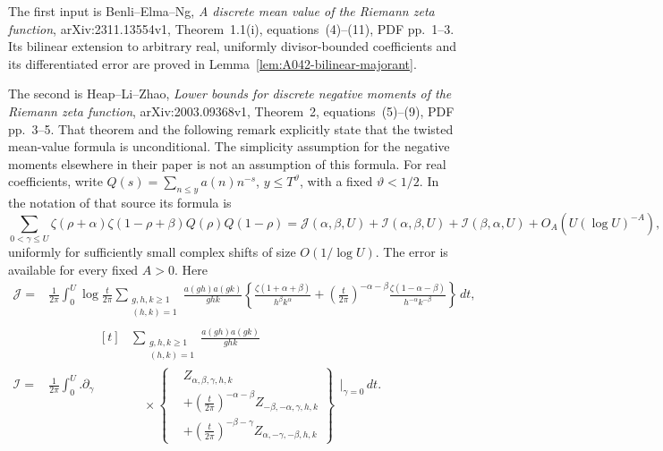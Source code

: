 The first input is Benli--Elma--Ng,
\emph{A discrete mean value of the Riemann zeta function},
arXiv:2311.13554v1, Theorem~1.1(i), equations~(4)--(11),
PDF pp.~1--3.  Its bilinear extension to arbitrary real,
uniformly divisor-bounded coefficients and its differentiated
error are proved in
Lemma~\ref{lem:A042-bilinear-majorant}.

The second is Heap--Li--Zhao,
\emph{Lower bounds for discrete negative moments of the Riemann
zeta function}, arXiv:2003.09368v1, Theorem~2, equations~(5)--(9),
PDF pp.~3--5.  That theorem and the following remark explicitly
state that the twisted mean-value formula is unconditional.
The simplicity assumption for the negative moments elsewhere
in their paper is not an assumption of this formula.
For real coefficients, write \(Q(s)=\sum_{n\le y}a(n)n^{-s}\),
\(y\le T^\vartheta\), with a fixed \(\vartheta<1/2\).  In the
notation of that source its formula is
\begin{equation}\label{eq:A047-HLZ}
 \sum_{0<\gamma\le U}\zeta(\rho+\alpha)
          \zeta(1-\rho+\beta)Q(\rho)Q(1-\rho)
 =\mathcal J(\alpha,\beta,U)+\mathcal I(\alpha,\beta,U)
       +\mathcal I(\beta,\alpha,U)+O_A(U(\log U)^{-A}),
\end{equation}
uniformly for sufficiently small complex shifts of size
\(O(1/\log U)\).  The error is available for every fixed
\(A>0\).  Here
\begin{align}
 \mathcal J={}&\frac1{2\pi}\int_0^U\log\frac t{2\pi}
 \sum_{\substack{g,h,k\ge1\\(h,k)=1}}
 \frac{a(gh)a(gk)}{ghk}
 \left\{\frac{\zeta(1+\alpha+\beta)}{h^\beta k^\alpha}
  +\left(\frac t{2\pi}\right)^{-\alpha-\beta}
       \frac{\zeta(1-\alpha-\beta)}{h^{-\alpha}k^{-\beta}}
 \right\}\,dt, \label{eq:A047-J}\\
 \mathcal I={}&\frac1{2\pi}\int_0^U
 \bigl.\partial_\gamma
 \begin{aligned}[t]
 &\sum_{\substack{g,h,k\ge1\\(h,k)=1}}
          \frac{a(gh)a(gk)}{ghk}\\
 &\quad{}\times
 \left\{\begin{aligned}
 &Z_{\alpha,\beta,\gamma,h,k}\\
 &+\left(\frac t{2\pi}\right)^{-\alpha-\beta}
          Z_{-\beta,-\alpha,\gamma,h,k}\\
 &+\left(\frac t{2\pi}\right)^{-\beta-\gamma}
          Z_{\alpha,-\gamma,-\beta,h,k}
 \end{aligned}\right\}
 \end{aligned}\bigr|_{\gamma=0}\,dt . \label{eq:A047-I}
\end{align}

